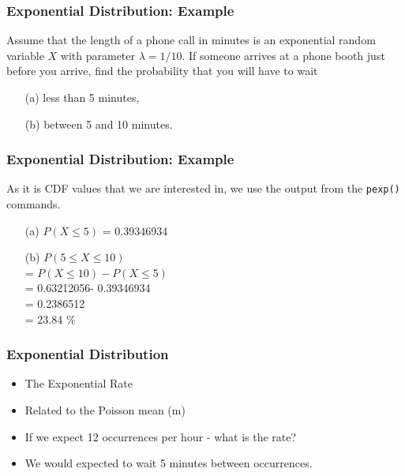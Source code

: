 \documentclass[a4]{beamer}
\begin{document}
\begin{frame}[fragile]
\frametitle{Exponential Distribution: Example}
Assume that the length of a phone call in minutes is an exponential random variable $X$ with parameter
$\lambda = 1/10$. If someone arrives at a phone booth just before you arrive, find the probability that you
will have to wait \begin{itemize}
\item[(a)] less than 5 minutes,
\item[(b)] between 5 and 10 minutes.
\end{itemize}
\end{frame}




\begin{frame}[fragile]
\frametitle{Exponential Distribution: Example}

As it is CDF values that we are interested in, we use the output from the \texttt{pexp()} commands.

\begin{itemize}
\item[(a)] $P(X \leq 5)$ = 0.39346934
\item[(b)] $P(5 \leq X \leq 10)$ \\ = $P( X \leq 10) - P( X \leq 5)$ \\ = 0.63212056- 0.39346934 \\ = 0.2386512 \\= 23.84 $\%$
\end{itemize}

\end{frame}



\begin{frame}[fragile]
\frametitle{Exponential Distribution}
\begin{itemize}
\item The Exponential Rate
\item Related to the Poisson mean (m)
\item If we expect 12 occurrences per hour - what is the rate?
\item We would expected to wait 5 minutes between occurrences.
\end{itemize}
\end{frame}
\end{document}
